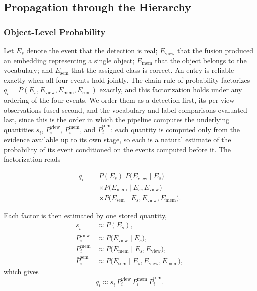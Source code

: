 \subsection{Propagation through the Hierarchy}
\label{sec:propagation}

\subsubsection{Object-Level Probability}
\label{sec:object-probability}

Let $E^{}_s$ denote the event that the detection is real; $E^{}_{\mathrm{view}}$ that the fusion produced an embedding representing a single object; $E^{}_{\mathrm{mem}}$ that the object belongs to the vocabulary; and $E^{}_{\mathrm{sem}}$ that the assigned class is correct. An entry is reliable exactly when all four events hold jointly. The chain rule of probability factorizes $q^{}_i = P(E^{}_s, E^{}_{\mathrm{view}}, E^{}_{\mathrm{mem}}, E^{}_{\mathrm{sem}})$ exactly, and this factorization holds under any ordering of the four events. We order them as a detection first, its per-view observations fused second, and the vocabulary and label comparisons evaluated last, since this is the order in which the pipeline computes the underlying quantities $s^{}_i$, $P^{\mathrm{view}}_i$, $P^{\mathrm{mem}}_i$, and $\bar{P}^{\mathrm{sem}}_i$: each quantity is computed only from the evidence available up to its own stage, so each is a natural estimate of the probability of its event conditioned on the events computed before it.
The factorization reads

\begin{equation}
    \begin{aligned}
        q^{}_i ={}& P(E^{}_s)\;
        P\bigl(E^{}_{\mathrm{view}} \mid E^{}_s\bigr)\; \\
        &\times P\bigl(E^{}_{\mathrm{mem}} \mid E^{}_s, E^{}_{\mathrm{view}}\bigr)\; \\
        &\times P\bigl(E^{}_{\mathrm{sem}} \mid E^{}_s, E^{}_{\mathrm{view}}, E^{}_{\mathrm{mem}}\bigr) .
    \end{aligned}
    \label{eq:obj-prob-chain}
\end{equation}

Each factor is then estimated by one stored quantity,
\begin{equation}
    \begin{aligned}
        s^{}_i &\approx P(E^{}_s), \\
        P^{\mathrm{view}}_i &\approx P\bigl(E^{}_{\mathrm{view}} \mid E^{}_s\bigr), \\
        P^{\mathrm{mem}}_i &\approx P\bigl(E^{}_{\mathrm{mem}} \mid E^{}_s, E^{}_{\mathrm{view}}\bigr), \\
        \bar{P}^{\mathrm{sem}}_i &\approx P\bigl(E^{}_{\mathrm{sem}} \mid E^{}_s, E^{}_{\mathrm{view}}, E^{}_{\mathrm{mem}}\bigr),
    \end{aligned}
    \label{eq:obj-prob-subst}
\end{equation}
which gives
\begin{equation}
    q^{}_i \approx s^{}_i \, P^{\mathrm{view}}_i \, P^{\mathrm{mem}}_i \, \bar{P}^{\mathrm{sem}}_i .
    \label{eq:obj-prob}
\end{equation}

